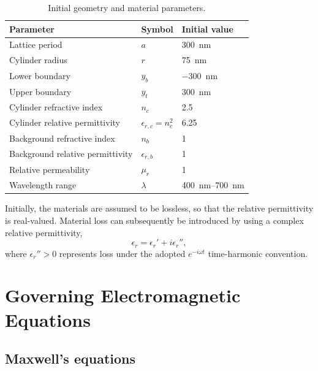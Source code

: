 \documentclass{article}
\begin{document}
\begin{table}[H]
    \centering
    \caption{Initial geometry and material parameters.}
    \label{tab:parameters}
    \begin{tabular}{lll}
        \toprule
        Parameter & Symbol & Initial value\\
        \midrule
        Lattice period & $a$ & \SI{300}{\nano\meter}\\
        Cylinder radius & $r$ & \SI{75}{\nano\meter}\\
        Lower boundary & $y_b$ & \SI{-300}{\nano\meter}\\
        Upper boundary & $y_t$ & \SI{300}{\nano\meter}\\
        Cylinder refractive index & $n_c$ & 2.5\\
        Cylinder relative permittivity & $\epsilon_{r,c}=n_c^2$ & 6.25\\
        Background refractive index & $n_b$ & 1\\
        Background relative permittivity & $\epsilon_{r,b}$ & 1\\
        Relative permeability & $\mu_r$ & 1\\
        Wavelength range & $\lambda$ & \SIrange{400}{700}{\nano\meter}\\
        \bottomrule
    \end{tabular}
\end{table}

Initially, the materials are assumed to be lossless, so that the relative
permittivity is real-valued. Material loss can subsequently be introduced
by using a complex relative permittivity,
\begin{equation}
    \epsilon_r = \epsilon_r' + i\epsilon_r'',
    \label{eq:complex_permittivity}
\end{equation}
where $\epsilon_r''>0$ represents loss under the adopted
$e^{-i\omega t}$ time-harmonic convention.

\chapter{Governing Electromagnetic Equations}

\section{Maxwell's equations}
\end{document}
